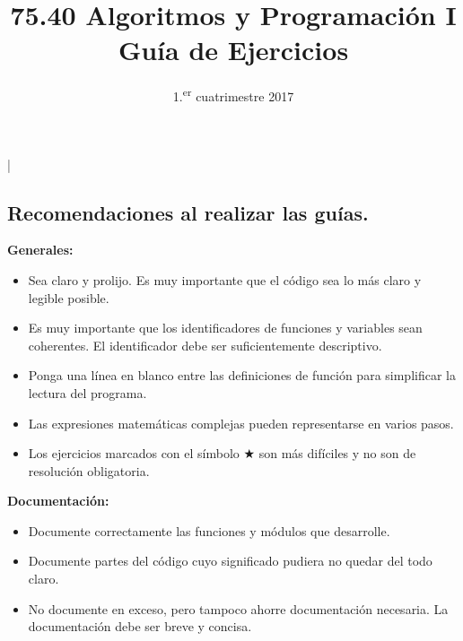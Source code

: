 \documentclass[11pt,spanish,a4paper,twoside,openany]{book}
\title{75.40 Algoritmos y Programación I \\
    \textbf{Guía de Ejercicios}}
\date{1.\textsuperscript{er} cuatrimestre 2017}
\theoremstyle{definition}
\theoremstyle{definition}
\theoremstyle{remark}
\begin{document}

\begin{extract*}
\lstMakeShortInline[style=inlinecode]|
\end{extract*}

\begin{extract} %
\maketitle
\thispagestyle{empty}

\newpage

\section*{Recomendaciones al realizar las guías.}

\textbf{Generales:}
\begin{itemize}
	\item Sea claro y prolijo. Es muy importante que el código sea lo más claro y legible posible.
	\item Es muy importante que los identificadores de funciones y variables sean coherentes. El identificador debe ser suficientemente descriptivo.
	\item Ponga una línea en blanco entre las definiciones de función para simplificar la lectura del programa.
	\item Las expresiones matemáticas complejas pueden representarse en varios pasos.
	\item Los ejercicios marcados con el símbolo $\bigstar$ son más difíciles y no son de resolución obligatoria.
\end{itemize}

\textbf{Documentación:}
\begin{itemize}
	\item Documente correctamente las funciones y módulos que desarrolle.
	\item Documente partes del código cuyo significado pudiera no quedar del todo claro.
	\item No documente en exceso, pero tampoco ahorre documentación necesaria. La documentación debe ser breve y concisa.
\end{itemize}
\end{extract}
\end{document}

